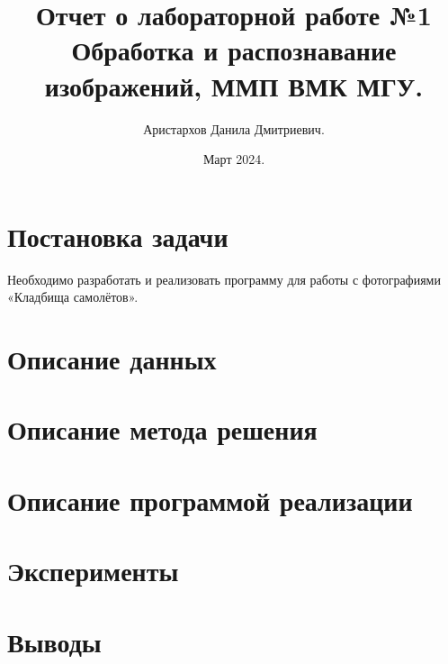 \documentclass[11pt]{extarticle}
\title{Отчет о лабораторной работе №1 \\[6mm] \large Обработка и распознавание изображений, ММП ВМК МГУ.}
\author{Аристархов Данила Дмитриевич.}
\date{Март 2024.}
\begin{document}
\maketitle
{
  \hypersetup{linkcolor=black}
  \tableofcontents
}
\newpage

\section{Постановка задачи}
Необходимо разработать и реализовать программу для работы с фотографиями «Кладбища самолётов».

\section{Описание данных}

\section{Описание метода решения}

\section{Описание программой реализации}
 
\section{Эксперименты}

\section{Выводы}
\end{document}
